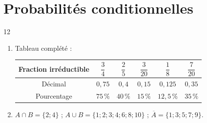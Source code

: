 \documentclass[10pt,a4paper]{article}
\begin{document}
\section{Probabilités conditionnelles}

\begin{corr}{12}
\begin{enumerate}[leftmargin=*]
    \item Tableau complété :
    \begin{center}
    \renewcommand{\arraystretch}{1.8}
    \begin{tabular}{|c|c|c|c|c|c|}
        \hline
        Fraction irréductible & \(\dfrac{3}{4}\) & \(\dfrac{2}{5}\) & \(\dfrac{3}{20}\) & \(\dfrac{1}{8}\) & \(\dfrac{7}{20}\) \\ \hline
        Décimal & \(0,75\) & \(0,4\) & \(0,15\) & \(0,125\) & \(0,35\) \\ \hline
        Pourcentage & \(75\,\%\) & \(40\,\%\) & \(15\,\%\) & \(12,5\,\%\) & \(35\,\%\) \\ \hline
    \end{tabular}
    \end{center}
    \item \(A\cap B=\{2;4\}\) ; \(A\cup B=\{1;2;3;4;6;8;10\}\) ; \(\overline{A}=\{1;3;5;7;9\}\).
\end{enumerate}
\end{corr}
\end{document}
